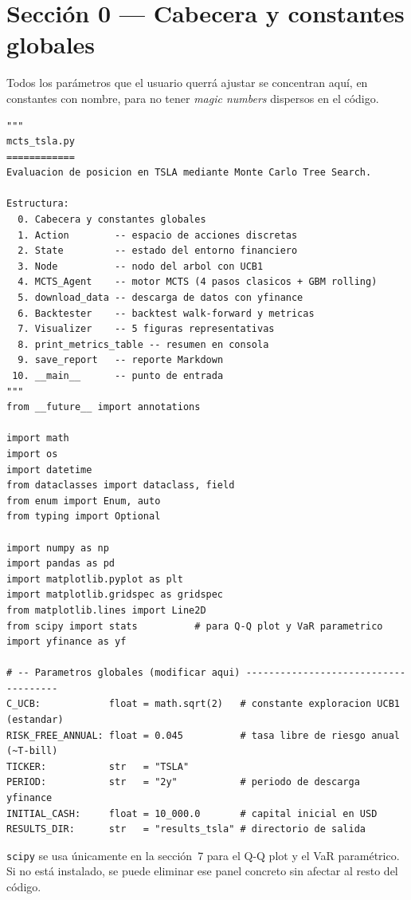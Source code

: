 \documentclass[12pt, a4paper]{article}
\begin{document}
\section{Sección 0 --- Cabecera y constantes globales}

Todos los parámetros que el usuario querrá ajustar se concentran aquí, en
constantes con nombre, para no tener \emph{magic numbers} dispersos en el código.

\begin{lstlisting}[caption={Cabecera e imports de \texttt{mcts\_tsla.py}}]
"""
mcts_tsla.py
============
Evaluacion de posicion en TSLA mediante Monte Carlo Tree Search.

Estructura:
  0. Cabecera y constantes globales
  1. Action        -- espacio de acciones discretas
  2. State         -- estado del entorno financiero
  3. Node          -- nodo del arbol con UCB1
  4. MCTS_Agent    -- motor MCTS (4 pasos clasicos + GBM rolling)
  5. download_data -- descarga de datos con yfinance
  6. Backtester    -- backtest walk-forward y metricas
  7. Visualizer    -- 5 figuras representativas
  8. print_metrics_table -- resumen en consola
  9. save_report   -- reporte Markdown
 10. __main__      -- punto de entrada
"""
from __future__ import annotations

import math
import os
import datetime
from dataclasses import dataclass, field
from enum import Enum, auto
from typing import Optional

import numpy as np
import pandas as pd
import matplotlib.pyplot as plt
import matplotlib.gridspec as gridspec
from matplotlib.lines import Line2D
from scipy import stats          # para Q-Q plot y VaR parametrico
import yfinance as yf

# -- Parametros globales (modificar aqui) -------------------------------------
C_UCB:            float = math.sqrt(2)   # constante exploracion UCB1 (estandar)
RISK_FREE_ANNUAL: float = 0.045          # tasa libre de riesgo anual (~T-bill)
TICKER:           str   = "TSLA"
PERIOD:           str   = "2y"           # periodo de descarga yfinance
INITIAL_CASH:     float = 10_000.0       # capital inicial en USD
RESULTS_DIR:      str   = "results_tsla" # directorio de salida
\end{lstlisting}

\begin{tcolorbox}[nota]
  \texttt{scipy} se usa únicamente en la sección~7 para el Q-Q plot y el VaR
  paramétrico. Si no está instalado, se puede eliminar ese panel concreto sin
  afectar al resto del código.
\end{tcolorbox}
\end{document}
